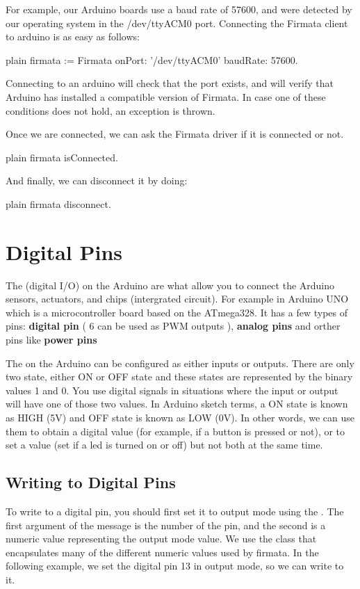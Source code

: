 \documentclass[10pt,twoside,english]{_support/latex/sbabook/sbabook}
\begin{document}
For example, our Arduino boards use a baud rate of 57600, and were detected by our operating system in the /dev/ttyACM0 port. 
Connecting the Firmata client to arduino is as easy as follows:

\begin{displaycode}{plain}
  firmata := Firmata onPort: '/dev/ttyACM0' baudRate: 57600.
\end{displaycode}

Connecting to an arduino will check that the port exists, and will verify that Arduino has installed a compatible version of Firmata. 
In case one of these conditions does not hold, an exception is thrown.

Once we are connected, we can ask the Firmata driver if it is connected or not.

\begin{displaycode}{plain}
  firmata isConnected.
\end{displaycode}

And finally, we can disconnect it by doing:

\begin{displaycode}{plain}
  firmata disconnect.
\end{displaycode}
\section{Digital Pins}
The  (digital I/O) on the Arduino are what allow you to connect the Arduino sensors, actuators, and chips (intergrated circuit).
For example in Arduino UNO which is a microcontroller board based on the ATmega328. 
It has a few types of pins: \textbf{digital pin} ( 6 can be used as PWM outputs ), \textbf{analog pins} and orther pins like \textbf{power pins}

The  on the Arduino can be configured as either inputs or outputs. 
There are only two state, either ON or OFF state and these states are represented by the binary values 1 and 0. 
You use digital signals in situations where the input or output will have one of those two values. 
In Arduino sketch terms, a ON state is known as HIGH (5V) and OFF state is known as LOW (0V). 
In other words, we can use them to obtain a digital value (for example, if a button is pressed or not), or to set a value (set if a led is turned on or off) but not both at the same time.
\subsection{Writing to Digital Pins}
To write to a digital pin, you should first set it to output mode using the . 
The first argument of the message is the number of the pin, and the second is a numeric value representing the output mode value. 
We use the  class that encapsulates many of the different numeric values used by firmata. 
In the following example, we set the digital pin 13 in output mode, so we can write to it.
\end{document}
